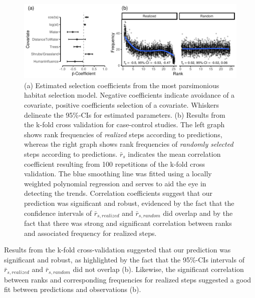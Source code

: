 \documentclass[abstract=on,10pt,a4paper,bibliography=totocnumbered]{article}
\begin{document}
\begin{figure}[h]
  \begin{center}
    \includegraphics[width = \textwidth]{99_PermeabilityResults.pdf}
    \caption{(a) Estimated selection coefficients from the most parsimonious
    habitat selection model. Negative coefficients indicate avoidance of a
    covariate, positive coefficients selection of a covariate. Whiskers
    delineate the 95\%-CIs for estimated parameters. (b) Results from the k-fold
    cross validation for case-control studies. The left graph shows rank
    frequencies of \textit{realized} steps according to predictions, whereas the
    right graph shows rank frequencies of \textit{randomly selected} steps
    according to predictions. \(\bar{r}_s\) indicates the mean correlation
    coefficient resulting from 100 repetitions of the k-fold cross validation.
    The blue smoothing line was fitted using a locally weighted polynomial
    regression and serves to aid the eye in detecting the trends. Correlation
    coefficients suggest that our prediction was significant and robust,
    evidenced by the fact that the confidence intervals of \(\bar{r}_{s,
    realized}\) and \(\bar{r}_{s, random}\) did overlap and by the fact that
    there was strong and significant correlation between ranks and associated
    frequency for realized steps.}
    \label{PermeabilityResults}
  \end{center}
\end{figure}

Results from the k-fold cross-validation suggested that our prediction was
significant and robust, as highlighted by the fact that the 95\%-CIs intervals
of \(\bar{r}_{s, realized}\) and \(\bar{r}_{s, random}\) did not overlap
(b). Likewise, the significant correlation between
ranks and corresponding frequencies for realized steps suggested a good fit
between predictions and observations (b).
\end{document}
